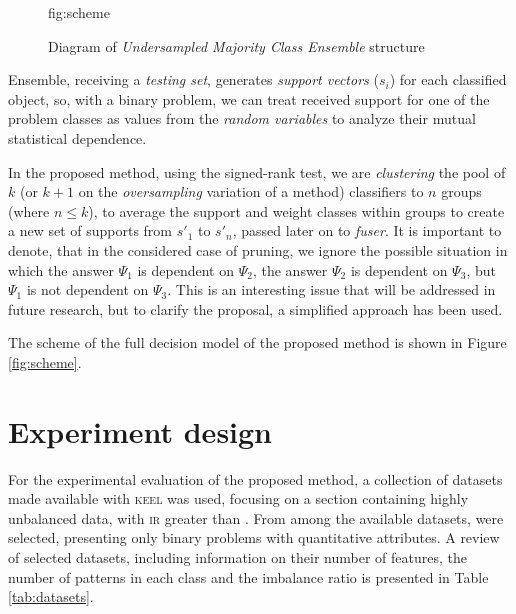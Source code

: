 \documentclass[pmlr]{jmlr}
\begin{document}
\begin{figure}[!h]
\floatconts
  {fig:scheme}
  {\caption{Diagram of \emph{Undersampled Majority Class Ensemble} structure}}
  {}
\end{figure}

Ensemble, receiving a \emph{testing set}, generates \emph{support vectors} ($s_i$) for each classified object, so, with a binary problem, we can treat received support for one of the problem classes as values from the \emph{random variables} to analyze their mutual statistical dependence.

In the proposed method, using the signed-rank test, we are \emph{clustering} the pool of $k$ (or $k+1$ on the \emph{oversampling} variation of a method) classifiers to $n$ groups (where $n\leq k$), to average the support and weight classes within groups to create a new set of supports from $s'_1$ to $s'_n$, passed later on to \emph{fuser}. It is important to denote, that in the considered case of pruning, we ignore the possible situation in which the answer $\Psi_1$ is dependent on $\Psi_2$, the answer $\Psi_2$ is dependent on $ \Psi_3$, but $\Psi_1$ is not dependent on $\Psi_3$. This is an interesting issue that will be addressed in future research, but to clarify the proposal, a simplified approach has been used.

The scheme of the full decision model of the proposed method is shown in Figure \ref{fig:scheme}.

\section{Experiment design}
\label{sec:intro}

For the experimental evaluation of the proposed method, a collection of datasets made available with \textsc{keel} \citep{alcala2011keel} was used, focusing on a section containing highly unbalanced data, with \textsc{ir} greater than  \citep{fernandez2009hierarchical}. From among the available datasets,  were selected, presenting only binary problems with quantitative attributes. A review of selected datasets, including information on their number of features, the number of patterns in each class and the imbalance ratio is presented in Table \ref{tab:datasets}.
\end{document}
